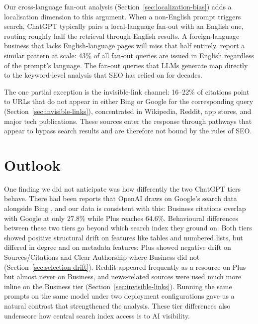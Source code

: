 Our cross-language fan-out analysis
(Section~\ref{sec:localization-bias}) adds a localisation dimension
to this argument. When a non-English prompt triggers search, ChatGPT
typically pairs a local-language fan-out with an English one,
routing roughly half the retrieval through English results.
A foreign-language business that lacks English-language pages will
miss that half entirely. \textcite{rudzki2026english} report a
similar pattern at scale: 43\% of all fan-out queries are issued
in English regardless of the prompt's language. The fan-out queries
that LLMs generate map directly to the keyword-level analysis that
SEO has relied on for decades.

The one partial exception is the invisible-link channel: 16--22\% of
citations point to URLs that do not appear in either Bing or Google
for the corresponding query (Section~\ref{sec:invisible-links}),
concentrated in Wikipedia, Reddit, app stores, and major tech
publications. These sources enter the response through pathways that
appear to bypass search results and are therefore not bound by the rules of SEO.

\section{Outlook}
\label{sec:outlook}

One finding we did not anticipate was how differently the two ChatGPT
tiers behave. There had been reports that OpenAI draws on Google's
search data alongside Bing
\parencite{theinformation2025openaiserpapi}, and our data is
consistent with this: Business citations overlap with Google at
only 27.8\% while Plus reaches 64.6\%.
Behavioural differences between these two tiers go beyond which search index they ground on.
Both tiers showed positive structural drift on features like tables and numbered lists, but differed in degree and on metadata features: Plus showed negative drift on Sources/Citations and Clear Authorship where Business did not
(Section~\ref{sec:selection-drift}). Reddit appeared frequently as a
resource on Plus but almost never on Business, and news-related
sources were used much more inline on the Business tier
(Section~\ref{sec:invisible-links}). Running the same prompts on the
same model under two deployment configurations gave us a natural
contrast that strengthened the analysis. These tier differences
also underscore how central search index access is to AI visibility.


